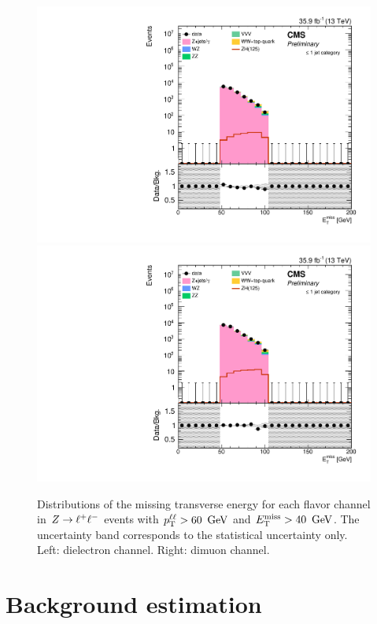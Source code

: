 \begin{figure}[hb]
\begin{center}
\includegraphics[width=\cmsFigWidth]{figures/presel_met_ee.pdf}
\includegraphics[width=\cmsFigWidth]{figures/presel_met_mm.pdf}
\caption{
  Distributions of the missing transverse energy for each flavor channel in $Z\to\ell^+\ell^-$ events with $p_{\mathrm{T}}^{\ell\ell} > 60~\,\text{Ge\hspace{-.08em}V}$ and $E_\mathrm{T}^{\mathrm{miss}} > 40~\,\text{Ge\hspace{-.08em}V}$.
  The uncertainty band corresponds to the statistical uncertainty only. Left: dielectron channel. Right: dimuon channel.
}
\label{fig:distributions_presel_met}
\end{center}
\end{figure}

\clearpage
\section{Background estimation}

